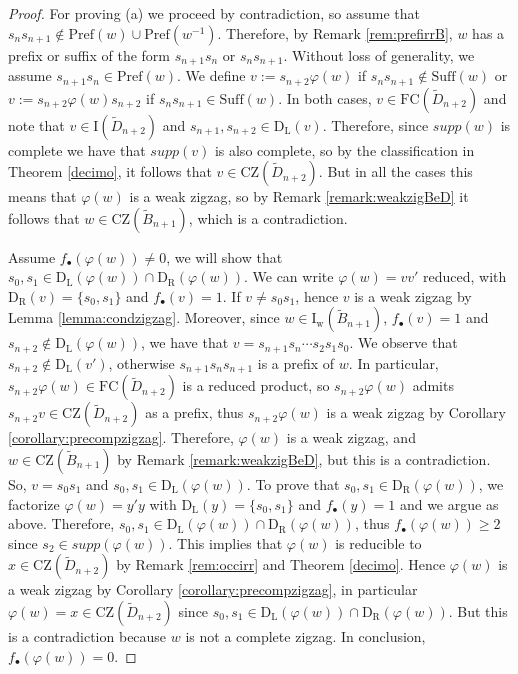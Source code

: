\documentclass{amsart}
\newcommand{\D}{{\widetilde{D}_{n+2}}}
\newcommand{\B}{{\widetilde{B}_{n+1}}}
\newcommand{\ld}{{\mathrm{D}_{\mathrm{L}}}}
\newcommand{\rd}{{\mathrm{D}_{\mathrm{R}}}}
\newcommand{\fc}{{\mathrm{FC}}}
\newcommand{\su}{\mathrm{Suff}}
\newcommand{\pr}{\mathrm{Pref}}
\newcommand{\zz}{\mathrm{CZ}}
\newcommand{\IR}{\mathrm{I_w}}
\newcommand{\I}{\mathrm{I}}
\newcommand{\nmap}{\varphi}
\theoremstyle{definition}
\begin{document}
\begin{proof}    
    For proving (a) we proceed by contradiction, so assume that $s_{n}s_{n+1}\notin \pr(w)\cup \pr(w^{-1})$. Therefore, by Remark \ref{rem:prefirrB}, $w$ has a prefix or suffix of the form $s_{n+1}s_{n}$ or $s_{n}s_{n+1}$. Without loss of generality, we assume $s_{n+1}s_n \in \pr(w)$. We define $v:=s_{n+2}\nmap(w)$ if $s_ns_{n+1}\notin \su(w)$ or $v:=s_{n+2}\nmap(w)s_{n+2}$ if $s_ns_{n+1}\in \su(w)$. In both cases, $v\in \fc(\D)$ and note that $v\in \I(\D)$ and $s_{n+1},s_{n+2}\in \ld(v)$. Therefore, since $supp(w)$ is complete we have that $supp(v)$ is also complete, so by the classification in Theorem \ref{decimo}, it follows that $v\in \zz(\D)$. But in all the cases this means that $\nmap(w)$ is a weak zigzag, so by Remark \ref{remark:weakzigBeD} it follows that $w\in \zz(\B)$, which is a contradiction. 
    

    Assume $f_\bullet(\nmap(w))\ne 0$, we will show that $s_0,s_1\in \ld(\nmap(w))\cap \rd(\nmap(w))$. We can write $\nmap(w)=vv'$ reduced, with $\rd(v)=\{s_0,s_1\}$ and $f_\bullet(v)=1$. If $v\ne s_0s_1$, hence $v$ is a weak zigzag by Lemma \ref{lemma:condzigzag}. Moreover, since $w \in \IR(\B)$, $f_\bullet(v)=1$ and $s_{n+2}\notin \ld(\nmap(w))$, we have that $v=s_{n+1}s_n\cdots s_2s_1s_0$. We observe that $s_{n+2}\notin \ld(v')$, otherwise $s_{n+1}s_{n}s_{n+1}$ is a prefix of $w$. In particular, $s_{n+2}\nmap(w)\in \fc(\D)$ is a reduced product, so $s_{n+2}\nmap(w)$ admits $s_{n+2}v\in \zz(\D)$ as a prefix, thus $s_{n+2}\nmap(w)$ is a weak zigzag by Corollary \ref{corollary:precompzigzag}. Therefore, $\nmap(w)$ is a weak zigzag, and $w\in \zz(\B)$ by Remark \ref{remark:weakzigBeD}, but this is a contradiction. 
    So, $v=s_0s_1$ and $s_0,s_1\in \ld(\nmap(w))$. To prove that $s_0,s_1\in \rd(\nmap(w))$, we factorize $\nmap(w)=y'y$ with $\ld(y)=\{s_0,s_1\}$ and $f_\bullet(y)=1$ and we argue as above. Therefore, $s_0,s_1\in \ld(\nmap(w))\cap \rd(\nmap(w))$, thus $f_\bullet(\nmap(w))\ge 2$ since $s_2\in supp(\nmap(w))$. This implies that $\nmap(w)$ is reducible to $x\in \zz(\D)$ by Remark \ref{rem:occirr} and Theorem \ref{decimo}. Hence $\nmap(w)$ is a weak zigzag by Corollary \ref{corollary:precompzigzag}, in particular $\nmap(w)=x\in \zz(\D)$ since $s_0,s_1\in \ld(\nmap(w))\cap \rd(\nmap(w))$. But this is a contradiction because $w$ is not a complete zigzag. In conclusion, $f_\bullet(\nmap(w))=0$. 
    

\end{proof}
\end{document}
